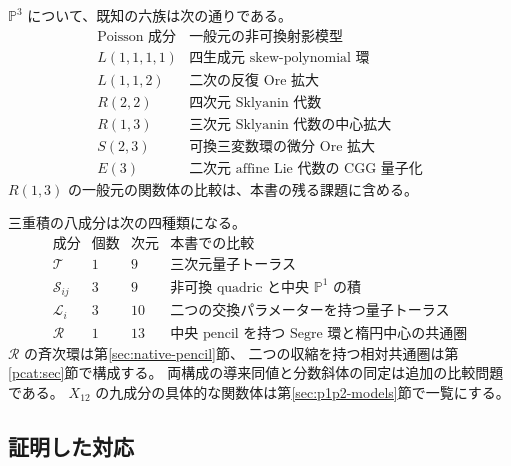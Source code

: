 \documentclass[11pt,a4paper]{ltjsarticle}
\theoremstyle{definition}
\newcommand{\PP}{\mathbb P}
\begin{document}
$\PP^3$ について、既知の六族は次の通りである。
\[
\begin{array}{c|l}
\text{Poisson 成分}&\text{一般元の非可換射影模型}\\\hline
L(1,1,1,1)&\text{四生成元 skew-polynomial 環}\\
L(1,1,2)&\text{二次の反復 Ore 拡大}\\
R(2,2)&\text{四次元 Sklyanin 代数}\\
R(1,3)&\text{三次元 Sklyanin 代数の中心拡大}\\
S(2,3)&\text{可換三変数環の微分 Ore 拡大}\\
E(3)&\text{二次元 affine Lie 代数の CGG 量子化}
\end{array}
\]
$R(1,3)$ の一般元の関数体の比較は、本書の残る課題に含める。

三重積の八成分は次の四種類になる。
\[
\begin{array}{c|c|c|l}
\text{成分}&\text{個数}&\text{次元}&\text{本書での比較}\\\hline
\mathcal T&1&9&\text{三次元量子トーラス}\\
\mathcal S_{ij}&3&9&\text{非可換 quadric と中央 }\PP^1\text{ の積}\\
\mathcal L_i&3&10&\text{二つの交換パラメーターを持つ量子トーラス}\\
\mathcal R&1&13&\text{中央 pencil を持つ Segre 環と楕円中心の共通圏}
\end{array}
\]
$\mathcal R$ の斉次環は第\ref{sec:native-pencil}節、
二つの収縮を持つ相対共通圏は第\ref{pcat:sec}節で構成する。
両構成の導来同値と分数斜体の同定は追加の比較問題である。
$X_{12}$ の九成分の具体的な関数体は第\ref{sec:p1p2-models}節で一覧にする。

\subsection{証明した対応}
\end{document}
